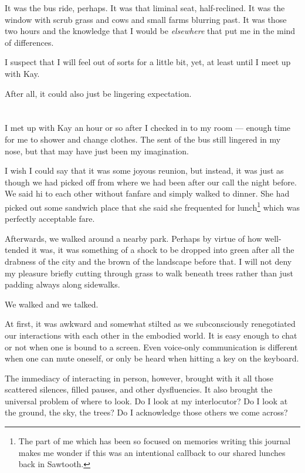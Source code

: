 It was the bus ride, perhaps. It was that liminal seat, half-reclined. It was the window with scrub grass and cows and small farms blurring past. It was those two hours and the knowledge that I would be \emph{elsewhere} that put me in the mind of differences.

I suspect that I will feel out of sorts for a little bit, yet, at least until I meet up with Kay.

After all, it could also just be lingering expectation.

\section{}

I met up with Kay an hour or so after I checked in to my room --- enough time for me to shower and change clothes. The sent of the bus still lingered in my nose, but that may have just been my imagination.

I wish I could say that it was some joyous reunion, but instead, it was just as though we had picked off from where we had been after our call the night before. We said hi to each other without fanfare and simply walked to dinner. She had picked out some sandwich place that she said she frequented for lunch\footnote{The part of me which has been so focused on memories writing this journal makes me wonder if this was an intentional callback to our shared lunches back in Sawtooth.} which was perfectly acceptable fare.

Afterwards, we walked around a nearby park. Perhaps by virtue of how well-tended it was, it was something of a shock to be dropped into green after all the drabness of the city and the brown of the landscape before that. I will not deny my pleasure briefly cutting through grass to walk beneath trees rather than just padding always along sidewalks.

We walked and we talked.

At first, it was awkward and somewhat stilted as we subconsciously renegotiated our interactions with each other in the embodied world. It is easy enough to chat or not when one is bound to a screen. Even voice-only communication is different when one can mute oneself, or only be heard when hitting a key on the keyboard.

The immediacy of interacting in person, however, brought with it all those scattered silences, filled pauses, and other dysfluencies. It also brought the universal problem of where to look. Do I look at my interlocutor? Do I look at the ground, the sky, the trees? Do I acknowledge those others we come across?

